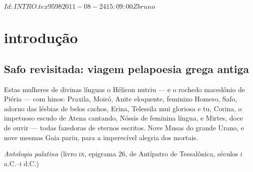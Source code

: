 \SVN $Id: INTRO.tex 9598 2011-08-24 15:09:00Z bruno $
\chapter[Introdução, por Giuliana Ragusa]{introdução}


\section{Safo revisitada: viagem pela\break poesia grega
antiga}

\epigraph{Estas mulheres de divinas línguas o Hélicon nutriu --- e o  %
rochedo macedônio de Piéria --- com hinos: %
Praxila, Moiró, Anite eloquente, feminino Homero, %
Safo, adorno das lésbias de belos cachos, %
Erina, Telessila mui gloriosa e tu, Corina, %
o impetuoso escudo de Atena cantando, %
Nóssis de feminina língua, e Mirtes, doce de ouvir ---  %
todas fazedoras de eternos escritos. %
Nove Musas do grande Urano, e nove mesmas %
Gaia pariu, para a imperecível alegria dos mortais.}
{\textit{Antologia palatina} (livro \textsc{ix}, epigrama 26, de Antípatro de Tessalônica,
séculos \textsc{i} a.C.--\textsc{i} d.C.)\footnotemark}


